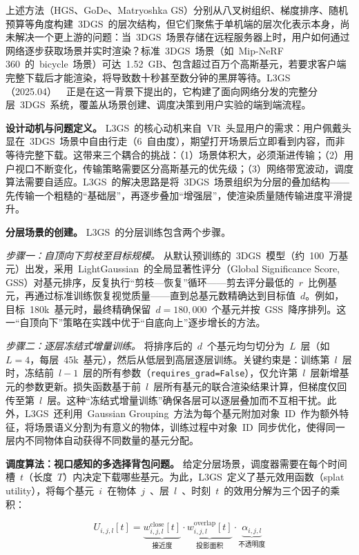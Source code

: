 上述方法（HGS、GoDe、Matryoshka GS）分别从八叉树组织、梯度排序、随机预算等角度构建~3DGS~的层次结构，但它们聚焦于单机端的层次化表示本身，尚未解决一个更上游的问题：当~3DGS~场景存储在远程服务器上时，用户如何通过网络逐步获取场景并实时渲染？标准~3DGS~场景（如~Mip-NeRF 360~的~bicycle~场景）可达~1.52~GB、包含超过百万个高斯基元，若要求客户端完整下载后才能渲染，将导致数十秒甚至数分钟的黑屏等待。L3GS（2025.04）~\cite{2504_05517}~正是在这一背景下提出的，它构建了面向网络分发的完整分层~3DGS~系统，覆盖从场景创建、调度决策到用户实验的端到端流程。

\textbf{设计动机与问题定义。}
L3GS~的核心动机来自~VR~头显用户的需求：用户佩戴头显在~3DGS~场景中自由行走（6~自由度），期望打开场景后立即看到内容，而非等待完整下载。这带来三个耦合的挑战：（1）场景体积大，必须渐进传输；（2）用户视口不断变化，传输策略需要区分高斯基元的优先级；（3）网络带宽波动，调度算法需要自适应。L3GS~的解决思路是将~3DGS~场景组织为分层的叠加结构——先传输一个粗糙的``基础层''，再逐步叠加``增强层''，使渲染质量随传输进度平滑提升。

\textbf{分层场景的创建。}
L3GS~的分层训练包含两个步骤。

\textit{步骤一：自顶向下剪枝至目标规模。}
从默认预训练的~3DGS~模型（约~100~万基元）出发，采用~LightGaussian~的全局显著性评分（Global Significance Score, GSS）对基元排序，反复执行``剪枝—恢复''循环——剪去评分最低的~$r$~比例基元，再通过标准训练恢复视觉质量——直到总基元数精确达到目标值~$d$。例如，目标~180k~基元时，最终精确保留~$d = 180{,}000$~个基元并按~GSS~降序排列。这一``自顶向下''策略在实践中优于``自底向上''逐步增长的方法。

\textit{步骤二：逐层冻结式增量训练。}
将排序后的~$d$~个基元均匀切分为~$L$~层（如~$L=4$，每层~45k~基元），然后从低层到高层逐层训练。关键约束是：训练第~$l$~层时，冻结前~$l-1$~层的所有参数（\texttt{requires\_grad=False}），仅允许第~$l$~层新增基元的参数更新。损失函数基于前~$l$~层所有基元的联合渲染结果计算，但梯度仅回传至第~$l$~层。这种``冻结式增量训练''确保各层可以逐层叠加而不互相干扰。此外，L3GS~还利用~Gaussian Grouping~方法为每个基元附加对象~ID~作为额外特征，将场景语义分割为有意义的物体，训练过程中对象~ID~同步优化，使得同一层内不同物体自动获得不同数量的基元分配。

\textbf{调度算法：视口感知的多选择背包问题。}
给定分层场景，调度器需要在每个时间槽~$t$（长度~$T$）内决定下载哪些基元。为此，L3GS~定义了基元效用函数（splat utility），将每个基元~$i$~在物体~$j$~、层~$l$~、时刻~$t$~的效用分解为三个因子的乘积：

\begin{equation}
U_{i,j,l}[t] = \underbrace{w_{i,j,l}^{\text{close}}[t]}_{\text{接近度}} \cdot \underbrace{w_{i,j,l}^{\text{overlap}}[t]}_{\text{投影面积}} \cdot \underbrace{\alpha_{i,j,l}}_{\text{不透明度}}
\end{equation}

